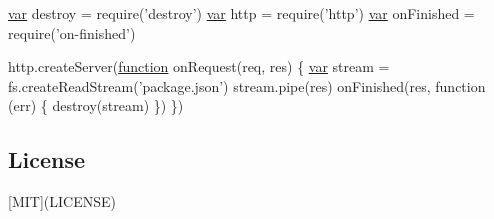 \begin{DoxyCode}
\hyperlink{018__def_8c_a335628f2e9085305224b4f9cc6e95ed5}{var} destroy = require(\textcolor{stringliteral}{'destroy'})
\hyperlink{018__def_8c_a335628f2e9085305224b4f9cc6e95ed5}{var} http = require('http')
\hyperlink{018__def_8c_a335628f2e9085305224b4f9cc6e95ed5}{var} onFinished = require('on-finished')

http.createServer(\hyperlink{class_test_a51a683fa4fcec142ab1574e00a7b6860}{function} onRequest(req, res) \{
  \hyperlink{018__def_8c_a335628f2e9085305224b4f9cc6e95ed5}{var} stream = fs.createReadStream(\textcolor{stringliteral}{'package.json'})
  stream.pipe(res)
  onFinished(res, \textcolor{keyword}{function} (err) \{
    destroy(stream)
  \})
\})
\end{DoxyCode}


\subsection*{License}

\mbox{[}M\+I\+T\mbox{]}(L\+I\+C\+E\+N\+S\+E) 